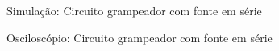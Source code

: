 \begin{figure}[H]
    \centering
    \caption{Simulação: Circuito grampeador com fonte em série}
    \vspace{-0.3cm}
    \label{fig:SimulacaoCircuito06}
\end{figure}

\begin{figure}[H]
    \centering
    \caption{Osciloscópio: Circuito grampeador com fonte em série}
    \vspace{-0.3cm}
    \label{fig:OsciloscopioCircuito06}
\end{figure}
